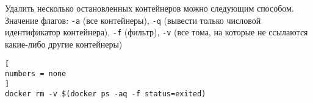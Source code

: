 \documentclass[%
	11pt,
	a4paper,
	utf8,
		]{article}
\begin{document}
Удалить несколько остановленных контейнеров можно следующим способом. Значение флагов: \texttt{-a} (все контейнеры), \texttt{-q} (вывести только числовой идентификатор контейнера), \texttt{-f} (фильтр), \texttt{-v} (все тома, на которые не ссылаются какие-либо другие контейнеры)

\begin{lstlisting}[
numbers = none
]
docker rm -v $(docker ps -aq -f status=exited)
\end{lstlisting}


\begin{thebibliography}{99}
	
\end{thebibliography}

\end{document}
